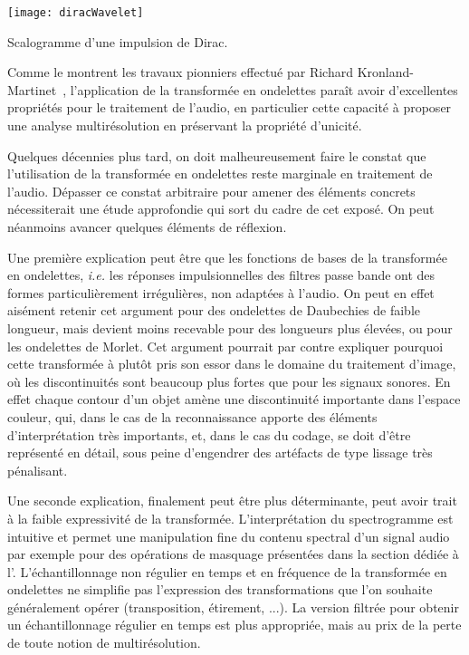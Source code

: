 \begin{marginfigure}
  \texttt{[image: diracWavelet]}
  \caption{Scalogramme d'une impulsion de Dirac.}
  \label{fig:dirac}
\end{marginfigure}

Comme le montrent les travaux pionniers effectué par Richard Kronland-Martinet~\cite{kronland1987analysis}, l'application de la transformée en ondelettes paraît avoir d'excellentes propriétés pour le traitement de l'audio, en particulier cette capacité à proposer une analyse multirésolution en préservant la propriété d'unicité.



Quelques décennies plus tard, on doit malheureusement faire le constat que l'utilisation de la transformée en ondelettes reste marginale en traitement de l'audio. Dépasser ce constat arbitraire pour amener des éléments concrets nécessiterait une étude approfondie qui sort du cadre de cet exposé. On peut néanmoins avancer quelques éléments de réflexion.

Une première explication peut être que les fonctions de bases de la transformée en ondelettes, \textit{i.e.} les réponses impulsionnelles des filtres passe bande ont des formes particulièrement irrégulières, non adaptées à l'audio. On peut en effet aisément retenir cet argument pour des ondelettes de Daubechies de faible longueur, mais devient moins recevable pour des longueurs plus élevées, ou pour les ondelettes de Morlet. Cet argument pourrait par contre expliquer pourquoi cette transformée à plutôt pris son essor dans le domaine du traitement d'image, où les discontinuités sont beaucoup plus fortes que pour les signaux sonores. En effet chaque contour d'un objet amène une discontinuité importante dans l'espace couleur, qui, dans le cas de la reconnaissance apporte des éléments d'interprétation très importants, et, dans le cas du codage, se doit d'être représenté en détail, sous peine d'engendrer des artéfacts de type \og lissage \fg très pénalisant.

Une seconde explication, finalement peut être plus déterminante, peut avoir trait à la faible expressivité de la transformée. L'interprétation  du spectrogramme est intuitive et permet une manipulation fine du contenu spectral d'un signal audio par exemple pour des opérations de masquage présentées dans la section dédiée à l'. L'échantillonnage non régulier en temps et en fréquence de la transformée en ondelettes ne simplifie pas l'expression des transformations que l'on souhaite généralement opérer (transposition, étirement, ...). La version filtrée pour obtenir un échantillonnage régulier en temps est plus appropriée, mais au prix de la perte de toute notion de multirésolution.

